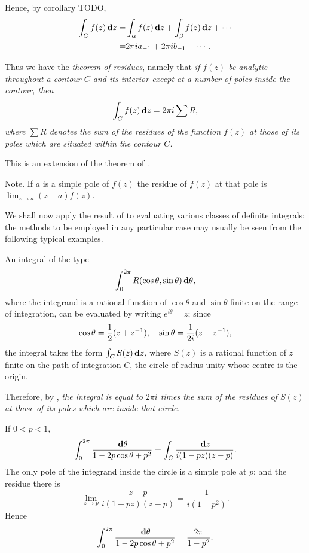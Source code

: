 Hence, by  corollary TODO,
\begin{align*}
  \int_{C} f(z) \, \mathbf{d} z
  =&
  \int_{\alpha} f(z) \, \mathbf{d} z
  + \int_{\beta} f(z) \, \mathbf{d} z
  + \cdots
  \\
  =&
  2\pi i a_{-1} + 2\pi i b_{-1} + \cdots.
\end{align*}

Thus we have the \emph{theorem of residues}, namely that
\emph{if $f(z)$ be analytic throughout a contour $C$ and its interior
  except at a number of poles inside the contour, then
  $$
  \int_{C} f(z) \, \mathbf{d} z = 2\pi i \sum R,
  $$
where $\sum R$ denotes the sum of the residues of the function $f(z)$ at
those of its poles which are situated within the contour $C$.}

This is an extension of the theorem of .

Note. If $a$ is a simple pole of $f(z)$ the residue of $f(z)$ at that pole
is $\lim_{z\rightarrow a} (z-a) f(z)$.


We shall now apply the result of  to evaluating
various classes of definite integrals; the methods to be employed in
any particular case may usually be seen from the following typical
examples.

An integral of the type
$$
\int_{0}^{2\pi} R(\cos \theta, \sin \theta) \dmeasure \theta,\index{Trigonometrical integrals}
$$
where the integrand is a rational function of $\cos\theta$ and
$\sin\theta$ finite on the range of integration, can be evaluated by
writing $e^{i\theta}=z$; since
$$
\cos\theta = \frac{1}{2}(z+z^{-1}),
\quad
\sin\theta = \frac{1}{2i} (z-z^{-1}),
$$
the integral takes the form $\int_{C} S(z) \, \mathbf{d} z$, where $S(z)$
is a rational function of $z$ finite on the path of integration $C$, the
circle of radius unity whose centre is the origin.

Therefore, by , \emph{the integral is equal to
  $2\pi i$ times the sum of the residues of $S(z)$ at those of its
  poles which are inside that circle.}

\begin{wandwexample}
  If $0 < p < 1$,
  $$
  \int_{0}^{2\pi}
  \frac{\, \mathbf{d} \theta}{ 1 - 2p\cos\theta + p^{2}}
  =
  \int_{C} \frac{ \, \mathbf{d} z}{ i (1-pz) (z-p) }.
  $$
  The only pole of the integrand inside the circle is a simple pole at
  $p$; and the residue there is
  $$
  \lim_{z \rightarrow p} \frac{z-p}{ i (1-pz)(z-p)}
  =
  \frac{1}{i (1-p^{2})}.
  $$
%
%
  Hence
  $$
  \int_{0}^{2\pi} \frac{\, \mathbf{d}\theta}{1 - 2p\cos\theta + p^{2}}
  =
  \frac{2\pi}{1-p^{2}}.
  $$
\end{wandwexample}

